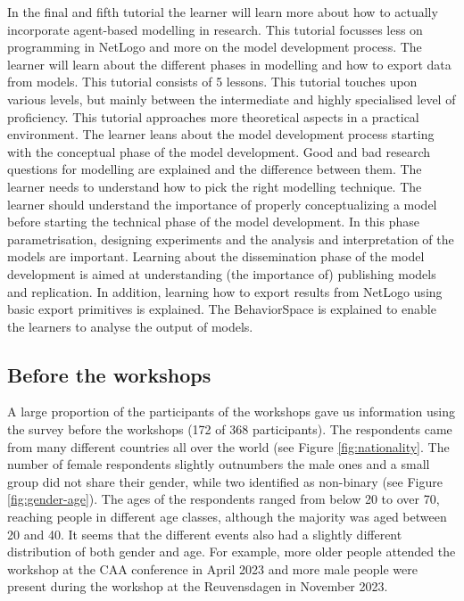 \documentclass[
]{article}
\begin{document}
In the final and fifth tutorial the learner will learn more about how to actually incorporate agent-based modelling in research. This tutorial focusses less on programming in NetLogo and more on the model development process. The learner will learn about the different phases in modelling and how to export data from models. This tutorial consists of 5 lessons. This tutorial touches upon various levels, but mainly between the intermediate and highly specialised level of proficiency. This tutorial approaches more theoretical aspects in a practical environment. The learner leans about the model development process starting with the conceptual phase of the model development. Good and bad research questions for modelling are explained and the difference between them. The learner needs to understand how to pick the right modelling technique. The learner should understand the importance of properly conceptualizing a model before starting the technical phase of the model development. In this phase parametrisation, designing experiments and the analysis and interpretation of the models are important. Learning about the dissemination phase of the model development is aimed at understanding (the importance of) publishing models and replication. In addition, learning how to export results from NetLogo using basic export primitives is explained. The BehaviorSpace is explained to enable the learners to analyse the output of models.

\hypertarget{before-the-workshops}{%
\subsection{Before the workshops}\label{before-the-workshops}}

A large proportion of the participants of the workshops gave us information using the survey before the workshops (172 of 368 participants). The respondents came from many different countries all over the world (see Figure \ref{fig:nationality}. The number of female respondents slightly outnumbers the male ones and a small group did not share their gender, while two identified as non-binary (see Figure \ref{fig:gender-age}). The ages of the respondents ranged from below 20 to over 70, reaching people in different age classes, although the majority was aged between 20 and 40. It seems that the different events also had a slightly different distribution of both gender and age. For example, more older people attended the workshop at the CAA conference in April 2023 and more male people were present during the workshop at the Reuvensdagen in November 2023.
\end{document}
